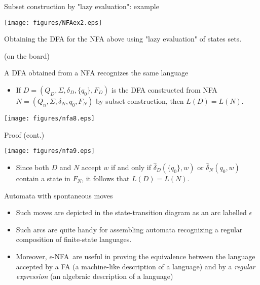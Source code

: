 \documentclass{prosper}%
\newcommand{\enfa}{{$\epsilon$-NFA}}
\begin{document}
\begin{slide}{\small Subset construction by "lazy evaluation": example}
\begin{center}
\texttt{[image: figures/NFAex2.eps]}
\end{center}

Obtaining the DFA for the NFA above using  "lazy evaluation" of states sets.

(on the board)
\end{slide}

\begin{slide}{\small A DFA obtained from a NFA recognizes the same language}
\begin{itemize}
\item If \(D=(Q_D, \Sigma, \delta_D, \{q_0\}, F_D)\)  is the DFA constructed from NFA \(N=(Q_n,\Sigma, \delta_N, q_0, F_N)\) by subset construction, then $L(D)=L(N)$.
\end{itemize}
\begin{center}
\texttt{[image: figures/nfa8.eps]}
\end{center}
\end{slide}

\begin{slide}{Proof (cont.)}
\begin{center}
\texttt{[image: figures/nfa9.eps]}
\end{center}
\begin{itemize}
\item Since both $D$ and $N$ accept $w$ if and only if $\hat{\delta}_D(\{q_0\}, w)$ or $\hat{\delta}_N(q_0, w)$ contain a state in  $F_N$, it follows that $L(D)=L(N)$.
\end{itemize}
\end{slide}

\begin{slide}{Automata with spontaneous moves}
\begin{itemize}
\item Such moves are depicted in the state-transition diagram as an arc labelled $\epsilon$
\item Such arcs are quite handy for assembling automata recognizing a regular composition of finite-state languages.
\item Moreover, \enfa\ are useful in proving the equivalence between the language accepted by a FA (a machine-like description of a language) and by a {\em regular expression} (an algebraic description of a language)
\end{itemize}
\end{slide}
\end{document}
